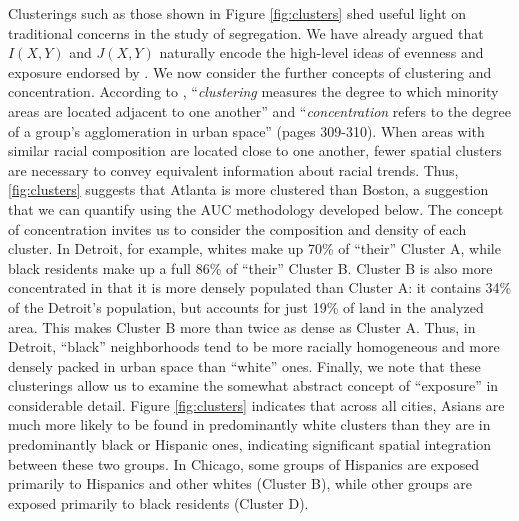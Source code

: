 	Clusterings such as those shown in Figure \ref{fig:clusters} shed useful light on traditional concerns in the study of segregation. We have already argued that $I(X,Y)$ and $J(X,Y)$ naturally encode the high-level ideas of evenness and exposure endorsed by \cite{Reardon2004}. We now consider the further concepts of clustering and concentration. According to \cite{Massey1988}, ``\emph{clustering} measures the degree to which minority areas are located adjacent to one another'' and ``\emph{concentration} refers to the degree of a group's agglomeration in urban space'' (pages 309-310). When areas with similar racial composition are located close to one another, fewer spatial clusters are necessary to convey equivalent information about racial trends. Thus, \ref{fig:clusters} suggests that Atlanta is more clustered than Boston, a suggestion that we can quantify using the AUC methodology developed below. The concept of concentration invites us to consider the composition and density of each cluster. In Detroit, for example, whites make up 70\% of ``their'' Cluster A, while black residents make up a full 86\% of ``their'' Cluster B. Cluster B is also more concentrated in that it is more densely populated than Cluster A: it contains 34\% of the Detroit's population, but accounts for just 19\% of land in the analyzed area. This makes Cluster B more than twice as dense as Cluster A. Thus, in Detroit, ``black'' neighborhoods tend to be more racially homogeneous and more densely packed in urban space than ``white'' ones. Finally, we note that these clusterings allow us to examine the somewhat abstract concept of ``exposure'' in considerable detail. Figure \ref{fig:clusters} indicates that across all cities, Asians are much more likely to be found in predominantly white clusters than they are in predominantly black or Hispanic ones, indicating significant spatial integration between these two groups. In Chicago, some groups of Hispanics are exposed primarily to Hispanics and other whites (Cluster B), while other groups are exposed primarily to black residents (Cluster D).

